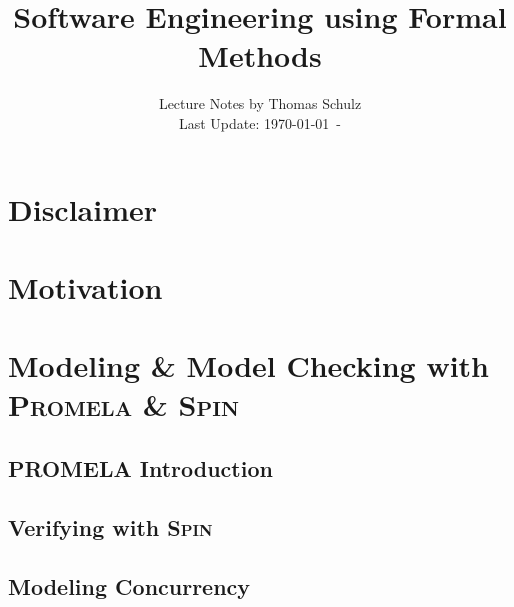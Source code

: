 \documentclass[12pt,accentcolor=tud1b,bibtotoc,colorback,linedtoc,liststotoc,bigchapter,noresetcounter]{tudreport}
\title{Software Engineering using Formal Methods}
\subtitle{Lecture Notes by Thomas Schulz\\
Last Update: \today \ - \thistime}
\newcommand{\capitals}[1]{\textsc{#1}}
\begin{document}
 

\maketitle
\tableofcontents


\begin{acronym}[Promela]
\setlength{\itemsep}{-\parsep}
\end{acronym}


\chapter*{Disclaimer}


\newpage

\chapter*{Motivation}


\newpage



\chapter{Modeling \& Model Checking with \capitals{Promela} \& \capitals{Spin}}


\section{PROMELA Introduction}

\newpage

\section{Verifying with \capitals{Spin}}

\newpage

\section{Modeling Concurrency}
\end{document}
